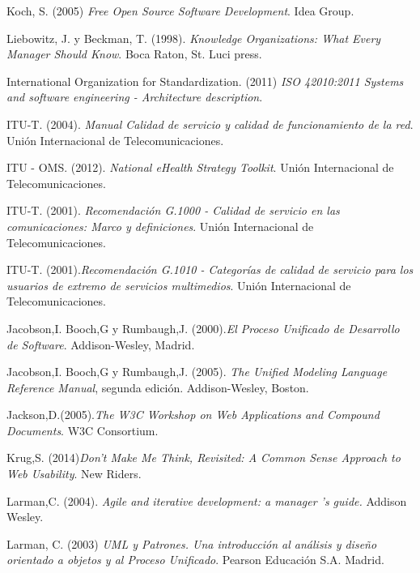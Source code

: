 \begin{thebibliography}{}
 Koch, S. (2005) \textit{Free Open Source Software Development}. Idea Group.

 Liebowitz, J. y Beckman, T. (1998). \textit{Knowledge Organizations: What Every Manager Should Know}. Boca Raton, St. Luci press.

 International Organization for Standardization. (2011) \textit{ISO 42010:2011 Systems and software engineering - Architecture description}. 

 ITU-T. (2004). \textit{Manual Calidad de servicio y calidad de funcionamiento de la red}. Unión Internacional de Telecomunicaciones.

 ITU - OMS. (2012). \textit{National eHealth Strategy Toolkit}. Unión Internacional de Telecomunicaciones.

 ITU-T. (2001). \textit{Recomendación G.1000 - Calidad de servicio en las comunicaciones: Marco y definiciones}. Unión Internacional de Telecomunicaciones.

 ITU-T. (2001).\textit{Recomendación G.1010 - Categorías de calidad de servicio para los usuarios de extremo de servicios multimedios}. Unión Internacional de Telecomunicaciones.

 Jacobson,I. Booch,G y Rumbaugh,J. (2000).\textit{El Proceso Unificado de Desarrollo de Software}. Addison-Wesley, Madrid.

 Jacobson,I. Booch,G y Rumbaugh,J. (2005). \textit{The Unified Modeling Language Reference Manual}, segunda edición. Addison-Wesley, Boston.

 Jackson,D.(2005).\textit{The W3C Workshop on Web Applications and Compound Documents}. W3C Consortium.

 Krug,S. (2014)\textit{Don't Make Me Think, Revisited: A Common Sense Approach to Web Usability}. New Riders.

 Larman,C. (2004). \textit{Agile and iterative development: a manager ’s guide.} Addison Wesley.

 Larman, C. (2003) \textit{UML y Patrones. Una introducción al análisis y diseño orientado a objetos y al Proceso Unificado}. Pearson Educación S.A. Madrid.


\end{thebibliography}

